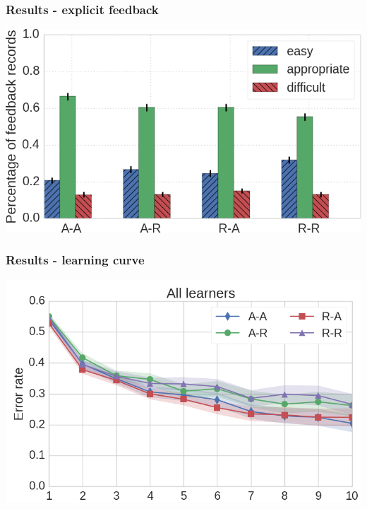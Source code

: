\documentclass[xcolor=svgnames]{beamer}
\begin{document}
\begin{frame}
	\frametitle{Results - explicit feedback}
   \includegraphics[width=\textwidth]{img/feedback.png}
\end{frame}
\begin{frame}
	\frametitle{Results - learning curve}
   \includegraphics[width=\textwidth]{img/learning_curves_all.png}
\end{frame}
\end{document}
